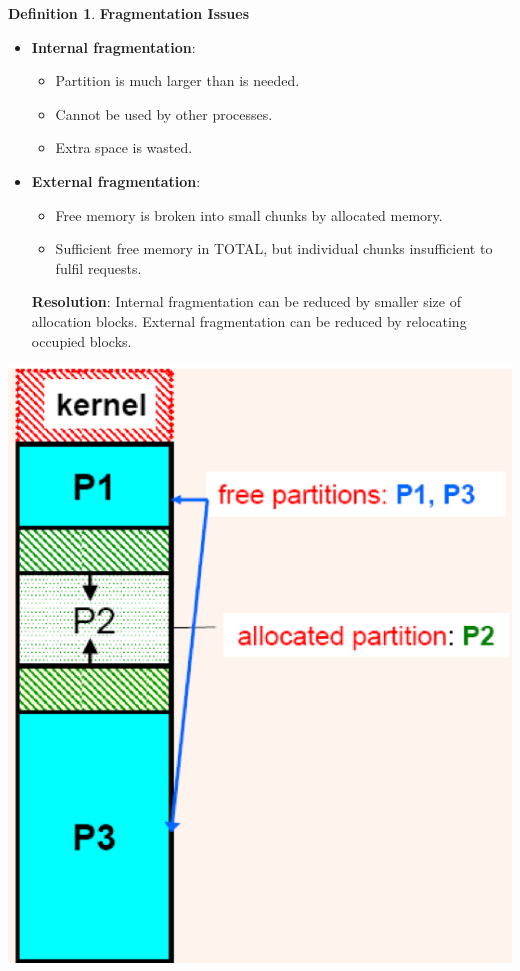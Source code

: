 \documentclass[11pt,a4paper]{article}
\theoremstyle{definition}
\newtheorem{definition}{Definition}[section]
\newenvironment{myitemize}
{ \begin{itemize}
    \setlength{\itemsep}{5pt}
    \setlength{\parskip}{0pt}
    \setlength{\parsep}{0pt}     }
{ \end{itemize}                  }
\begin{document}
\begin{definition}{\textbf{Fragmentation Issues}}
	
\begin{minipage}{0.7\linewidth}
	\begin{myitemize}
		\item \textbf{Internal fragmentation}:
		\begin{myitemize}
			\item Partition is much larger than is needed.
			\item Cannot be used by other processes.
			\item Extra space is wasted.
		\end{myitemize}
		\item \textbf{External fragmentation}:
		\begin{myitemize}
			\item Free memory is broken into small chunks by allocated memory.
			\item Sufficient free memory in TOTAL, but individual chunks insufficient to fulfil requests.
		\end{myitemize}
		\textbf{Resolution}: Internal fragmentation can be reduced by smaller size of allocation blocks. External fragmentation can be reduced by relocating occupied blocks.
	\end{myitemize}
\end{minipage}
\begin{minipage}{0.3\linewidth}
	\includegraphics[width=0.8\linewidth]{m4/fragmentationIssues}
\end{minipage}
\end{definition}
\end{document}
